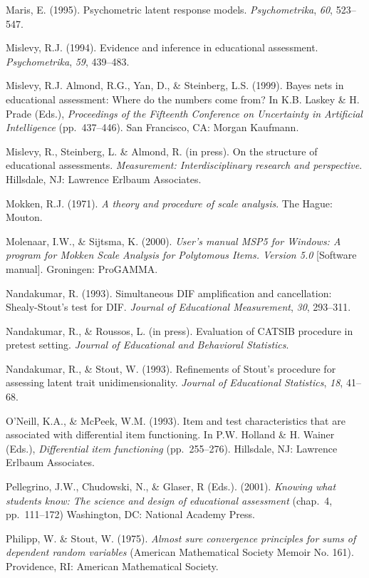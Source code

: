 \documentclass[titlepage,11pt,twoside]{article}
\begin{document}
\begin{thebibliography}
\bibitem Maris, E. (1995). Psychometric latent response models. \textit{Psychometrika}, \textit{60}, 523--547.

\bibitem Mislevy, R.J. (1994). Evidence and inference in educational assessment. \textit{Psychometrika}, \textit{59}, 439--483.

\bibitem Mislevy, R.J. Almond, R.G., Yan, D., \& Steinberg, L.S. (1999). Bayes nets in educational assessment: Where do the numbers come from? In K.B. Laskey \& H. Prade (Eds.), \textit{Proceedings of the Fifteenth Conference on Uncertainty in Artificial Intelligence} (pp.~437--446). San Francisco, CA: Morgan Kaufmann.

\bibitem Mislevy, R., Steinberg, L. \& Almond, R. (in press). On the structure of educational assessments. \textit{Measurement: Interdisciplinary research and perspective}. Hillsdale, NJ: Lawrence Erlbaum Associates.

\bibitem Mokken, R.J. (1971). \textit{A theory and procedure of scale analysis}. The Hague: Mouton.

\bibitem Molenaar, I.W., \& Sijtsma, K. (2000). \textit{User's manual MSP5 for Windows: A program for Mokken Scale Analysis for Polytomous Items. Version 5.0} [Software manual]. Groningen: ProGAMMA.

\bibitem Nandakumar, R. (1993). Simultaneous DIF amplification and cancellation: Shealy-Stout's test for DIF. \textit{Journal of Educational Measurement}, \textit{30}, 293--311.

\bibitem Nandakumar, R., \& Roussos, L. (in press). Evaluation of CATSIB procedure in pretest setting. \textit{Journal of Educational and Behavioral Statistics}.

\bibitem Nandakumar, R., \& Stout, W. (1993). Refinements of Stout's procedure for assessing latent trait unidimensionality. \textit{Journal of Educational Statistics}, \textit{18}, 41--68.

\bibitem O'Neill, K.A., \& McPeek, W.M. (1993). Item and test characteristics that are associated with differential item functioning. In P.W. Holland \& H. Wainer (Eds.), \textit{Differential item functioning} (pp.~255--276). Hillsdale, NJ: Lawrence Erlbaum Associates.

\bibitem Pellegrino, J.W., Chudowski, N., \& Glaser, R (Eds.). (2001). \textit{Knowing what students know: The science and design of educational assessment} (chap.~4, pp.~111--172) Washington, DC: National Academy Press.

\bibitem Philipp, W. \& Stout, W. (1975). \textit{Almost sure convergence principles for sums of dependent random variables} (American Mathematical Society Memoir No. 161). Providence, RI: American Mathematical Society.


\end{thebibliography}
\end{document}

